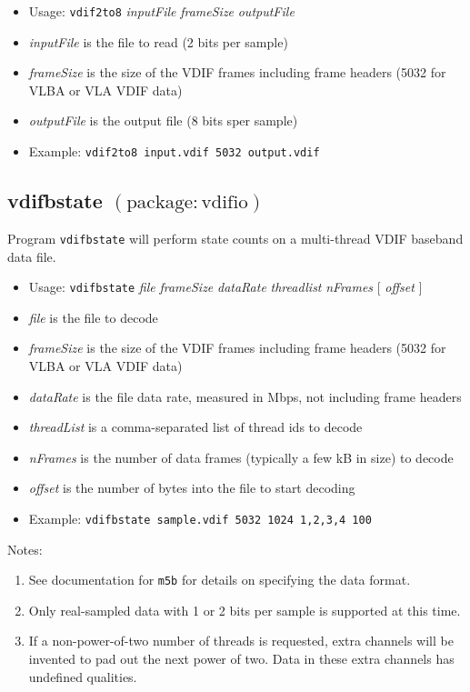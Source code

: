 \begin{itemize}
\item[] Usage: {\tt vdif2to8} {\em inputFile} {\em frameSize} {\em outputFile}
\item[] {\em inputFile} is the file to read (2 bits per sample)
\item[] {\em frameSize} is the size of the VDIF frames including frame headers (5032 for VLBA or VLA VDIF data)
\item[] {\em outputFile} is the output file (8 bits sper sample)
\item[] Example: {\tt vdif2to8 input.vdif 5032 output.vdif}
\end{itemize}








\subsection{vdifbstate {\small $\mathrm{(package: vdifio)}$}} \label{sec:vbstate}

Program {\tt vdifbstate} will perform state counts on a multi-thread VDIF baseband data file.

\begin{itemize}
\item[] Usage: {\tt vdifbstate} {\em file} {\em frameSize} {\em dataRate} {\em threadlist} {\em nFrames} $[$ {\em offset} $]$ 
\item[] {\em file} is the file to decode
\item[] {\em frameSize} is the size of the VDIF frames including frame headers (5032 for VLBA or VLA VDIF data)
\item[] {\em dataRate} is the file data rate, measured in Mbps, not including frame headers
\item[] {\em threadList} is a comma-separated list of thread ids to decode
\item[] {\em nFrames} is the number of data frames (typically a few kB in size) to decode
\item[] {\em offset} is the number of bytes into the file to start decoding
\item[] Example: {\tt vdifbstate sample.vdif 5032 1024 1,2,3,4 100}
\end{itemize}

\noindent
Notes:
\begin{enumerate}
\item See documentation for {\tt m5b} for details on specifying the data format.
\item Only real-sampled data with 1 or 2 bits per sample is supported at this time.
\item If a non-power-of-two number of threads is requested, extra channels will be invented to pad out the next power of two.
Data in these extra channels has undefined qualities.
\end{enumerate}



